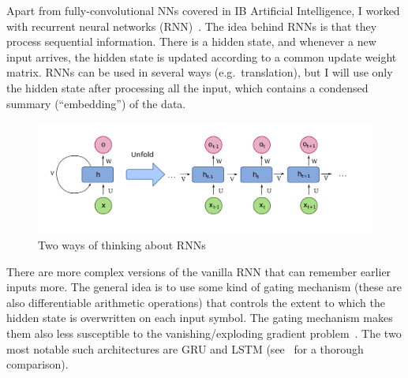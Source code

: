 Apart from fully-convolutional NNs covered in IB Artificial Intelligence, I worked with recurrent neural networks (RNN)~\cite{hopfield1982RNNoriginal}. The idea behind RNNs is that they process sequential information. There is a hidden state, and whenever a new input arrives, the hidden state is updated according to a common update weight matrix. RNNs can be used in several ways (e.g.\ translation), but I will use only the hidden state after processing all the input, which contains a condensed summary (``embedding'') of the data.


\begin{figure}[hbt!] \label{RNN-image}
    \centering
    \includegraphics[scale=0.2]{Chapter2/Figs/RNN.png}
    \caption{Two ways of thinking about RNNs~\cite{RNN}}
\end{figure}



There are more complex versions of the vanilla RNN that can remember earlier inputs more. The general idea is to use some kind of gating mechanism (these are also differentiable arithmetic operations) that controls the extent to which the hidden state is overwritten on each input symbol. The gating mechanism makes them also less susceptible to the vanishing/exploding gradient problem~\cite{noh2021rnnvanishinggradient}. The two most notable such architectures are GRU and LSTM (see~\cite{shewalkar2019rnngrulstm} for a thorough comparison).


